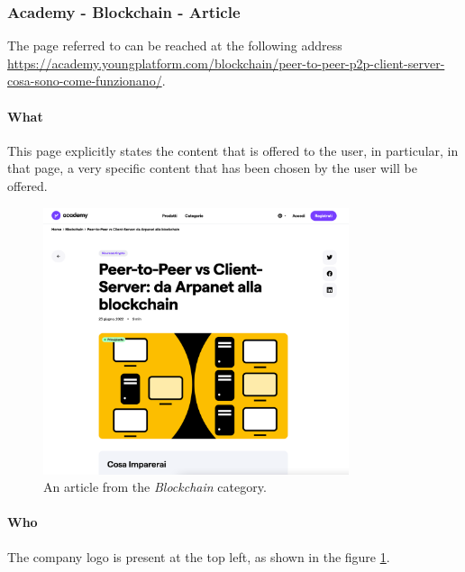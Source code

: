 \subsubsection{Academy - Blockchain - Article}

The page referred to can be reached at the following address \\
\href{https://academy.youngplatform.com/blockchain/peer-to-peer-p2p-client-server-cosa-sono-come-funzionano/}{https://academy.youngplatform.com/blockchain/peer-to-peer-p2p-client-server-cosa-sono-come-funzionano/}.

\paragraph{What}

This page explicitly states the content that is offered to the user, in 
particular, in that page, a very specific content that has been chosen by 
the user will be offered.

\begin{figure}[H]
  \centering
  \includegraphics[width=0.80\textwidth]{res/images/internal-pages/academy/academy-5.png}
  \caption{An article from the \textit{Blockchain} category.}
  \label{fig:academy-5}
\end{figure}

\paragraph{Who}

The company logo is present at the top left, as shown in the figure 
\ref{fig:academy-5}.

